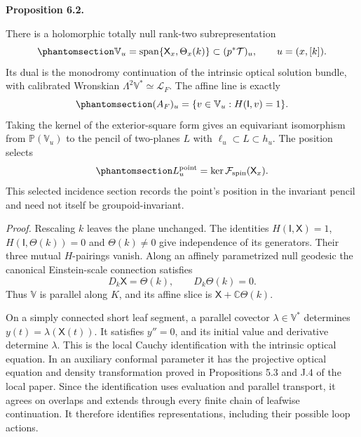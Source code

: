 \documentclass[
  english,
  11pt,
  reqno]{amsart}
\makeatletter
\newcommand{\pandocstatementheading}[1]{%
  \par\addpenalty{\@beginparpenalty}%
  \addvspace{.5\baselineskip plus .2\baselineskip minus .2\baselineskip}%
  {\normalfont\bfseries #1\par}%
  \nobreak\@afterindenttrue\@afterheading
}
\makeatother
\begin{document}
\pandocstatementheading{\protect{}\label{prop:global-optical-pencil-incidence}Proposition 6.2.}

There is a holomorphic totally null rank-two subrepresentation
\begin{equation}\protect\phantomsection\label{eq:global-optical-plane-representation}{
\mathbb V_u
=\operatorname{span}\{\mathsf X_x,\Theta_x(k)\}
\subset(p^*\mathcal T)_u,
\qquad u=(x,[k]).
}\end{equation} Its dual is the monodromy continuation of the intrinsic
optical solution bundle, with calibrated Wronskian
\(\Lambda^2\mathbb V^*\simeq\mathcal L_F\). The affine line is exactly
\begin{equation}\protect\phantomsection\label{eq:global-optical-affine-slice}{
(A_F)_u=\{v\in\mathbb V_u:H(\mathsf I,v)=1\}.
}\end{equation} Taking the kernel of the exterior-square form gives an
equivariant isomorphism from \(\mathbb P(\mathbb V_u)\) to the pencil of
two-planes \(L\) with \(\ell_u\subset L\subset h_u\). The position
selects
\begin{equation}\protect\phantomsection\label{eq:global-optical-point-plane}{
L_u^{\mathrm{point}}
=\ker\mathcal F_{\mathrm{spin}}(\mathsf X_x).
}\end{equation} This selected incidence section records the point's
position in the invariant pencil and need not itself be
groupoid-invariant.

\emph{Proof.} Rescaling \(k\) leaves the plane unchanged. The identities
\(H(\mathsf I,\mathsf X)=1\), \(H(\mathsf I,\Theta(k))=0\) and
\(\Theta(k)\ne0\) give independence of its generators. Their three
mutual \(H\)-pairings vanish. Along an affinely parametrized null
geodesic the canonical Einstein-scale connection satisfies \[
D_k\mathsf X=\Theta(k),
\qquad
D_k\Theta(k)=0.
\] Thus \(\mathbb V\) is parallel along \(K\), and its affine slice is
\(\mathsf X+\mathbb C\Theta(k)\).

On a simply connected short leaf segment, a parallel covector
\(\lambda\in\mathbb V^*\) determines \(y(t)=\lambda(\mathsf X(t))\). It
satisfies \(y''=0\), and its initial value and derivative determine
\(\lambda\). This is the local Cauchy identification with the intrinsic
optical equation. In an auxiliary conformal parameter it has the
projective optical equation and density transformation proved in
Propositions 5.3 and J.4 of the local paper. Since the identification
uses evaluation and parallel transport, it agrees on overlaps and
extends through every finite chain of leafwise continuation. It
therefore identifies representations, including their possible loop
actions.
\end{document}

